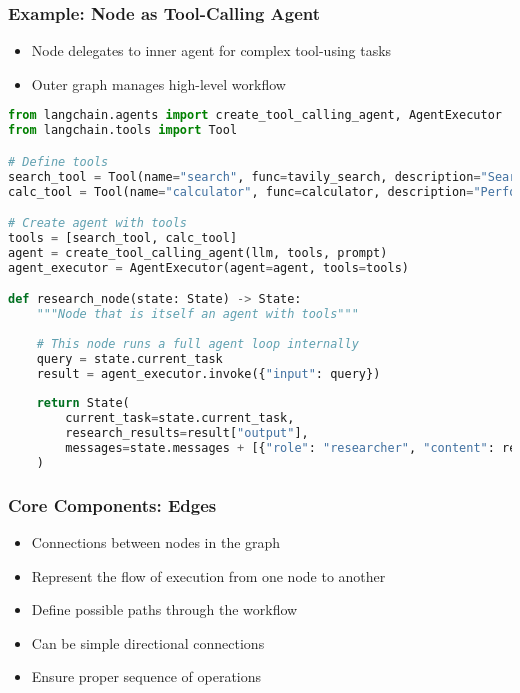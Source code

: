 \begin{frame}[fragile]\frametitle{Example: Node as Tool-Calling Agent}

      \begin{itemize}
        \item Node delegates to inner agent for complex tool-using tasks
        \item Outer graph manages high-level workflow
      \end{itemize}
	  
      \begin{lstlisting}[language=Python, basicstyle=\tiny]
from langchain.agents import create_tool_calling_agent, AgentExecutor
from langchain.tools import Tool

# Define tools
search_tool = Tool(name="search", func=tavily_search, description="Search the web")
calc_tool = Tool(name="calculator", func=calculator, description="Perform calculations")

# Create agent with tools
tools = [search_tool, calc_tool]
agent = create_tool_calling_agent(llm, tools, prompt)
agent_executor = AgentExecutor(agent=agent, tools=tools)

def research_node(state: State) -> State:
    """Node that is itself an agent with tools"""
    
    # This node runs a full agent loop internally
    query = state.current_task
    result = agent_executor.invoke({"input": query})
    
    return State(
        current_task=state.current_task,
        research_results=result["output"],
        messages=state.messages + [{"role": "researcher", "content": result["output"]}]
    )
      \end{lstlisting}
     
\end{frame}

\begin{frame}[fragile]\frametitle{Core Components: Edges}
      \begin{itemize}
        \item Connections between nodes in the graph
        \item Represent the flow of execution from one node to another
        \item Define possible paths through the workflow
        \item Can be simple directional connections
        \item Ensure proper sequence of operations
      \end{itemize}
\end{frame}

